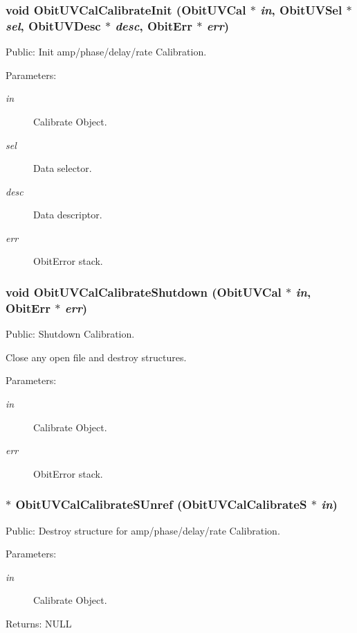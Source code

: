 \subsubsection{\setlength{\rightskip}{0pt plus 5cm}void Obit\-UVCal\-Calibrate\-Init ({\bf Obit\-UVCal} $\ast$ {\em in}, {\bf Obit\-UVSel} $\ast$ {\em sel}, {\bf Obit\-UVDesc} $\ast$ {\em desc}, {\bf Obit\-Err} $\ast$ {\em err})}\label{ObitUVCalCalibrate_8c_a9}


Public: Init amp/phase/delay/rate Calibration. 

\begin{Desc}
\item[Parameters:]
\begin{description}
\item[{\em in}]Calibrate Object. \item[{\em sel}]Data selector. \item[{\em desc}]Data descriptor. \item[{\em err}]Obit\-Error stack. \end{description}
\end{Desc}
\subsubsection{\setlength{\rightskip}{0pt plus 5cm}void Obit\-UVCal\-Calibrate\-Shutdown ({\bf Obit\-UVCal} $\ast$ {\em in}, {\bf Obit\-Err} $\ast$ {\em err})}\label{ObitUVCalCalibrate_8c_a11}


Public: Shutdown Calibration. 

Close any open file and destroy structures. \begin{Desc}
\item[Parameters:]
\begin{description}
\item[{\em in}]Calibrate Object. \item[{\em err}]Obit\-Error stack. \end{description}
\end{Desc}
\subsubsection{$\ast$ Obit\-UVCal\-Calibrate\-SUnref ({\bf Obit\-UVCal\-Calibrate\-S} $\ast$ {\em in})}\label{ObitUVCalCalibrate_8c_a12}


Public: Destroy structure for amp/phase/delay/rate Calibration. 

\begin{Desc}
\item[Parameters:]
\begin{description}
\item[{\em in}]Calibrate Object. \end{description}
\end{Desc}
\begin{Desc}
\item[Returns:]NULL \end{Desc}
